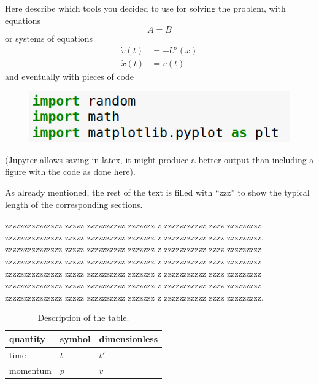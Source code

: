 \documentclass[prl,twocolumn]{revtex4-1}
\begin{document}
Here describe which tools you decided to use for solving the problem, with equations
\begin{equation}
  A=B
  \label{eq:simple}
\end{equation}
or systems of equations
\begin{align}
  \dot v(t) & =  -U'(x)\nonumber \\
  \dot x(t) & =  v(t)
  \label{eq:motion}
\end{align}
and  eventually with  pieces of code
\begin{figure}[h]
  \includegraphics[width=0.7\columnwidth]{line1.png}
\end{figure}
(Jupyter allows saving in latex, it might produce a better output than including a figure with the code as done here).

  As already mentioned, the rest of the text is filled with ``zzz'' to show the typical length of the corresponding sections.


  zzzzzzzzzzzzzzz zzzzz zzzzzzzzzz zzzzzzz z zzzzzzzzzzz zzzz zzzzzzzzz
  zzzzzzzzzzzzzzz zzzzz zzzzzzzzzz zzzzzzz z zzzzzzzzzzz zzzz zzzzzzzzz.
  zzzzzzzzzzzzzzz zzzzz zzzzzzzzzz zzzzzzz z zzzzzzzzzzz zzzz zzzzzzzzz
  zzzzzzzzzzzzzzz zzzzz zzzzzzzzzz zzzzzzz z zzzzzzzzzzz zzzz zzzzzzzzz
  zzzzzzzzzzzzzzz zzzzz zzzzzzzzzz zzzzzzz z zzzzzzzzzzz zzzz zzzzzzzzz
  zzzzzzzzzzzzzzz zzzzz zzzzzzzzzz zzzzzzz z zzzzzzzzzzz zzzz zzzzzzzzz
  zzzzzzzzzzzzzzz zzzzz zzzzzzzzzz zzzzzzz z zzzzzzzzzzz zzzz zzzzzzzzz.


  
\begin{table}[!b]
\begin{center}
\begin{tabular}{lll}
quantity & symbol & dimensionless \\
\hline
time & $t$ & $t'$  \\
momentum & $p$ & $v$
\end{tabular}
\end{center}
\caption{Description of the table.}
\label{tab:1}
\end{table}
\end{document}
